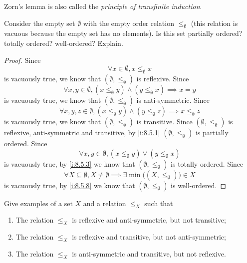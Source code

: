 \begin{note}
  Zorn's lemma is also called the \emph{principle of transfinite induction}.
\end{note}

\exercisesection

\begin{ex}\label{i:ex:8.5.1}
  Consider the empty set \(\emptyset\) with the empty order relation \(\leq_\emptyset\)
  (this relation is vacuous because the empty set has no elements).
  Is this set partially ordered? totally ordered? well-ordered? Explain.
\end{ex}

\begin{proof}
  Since
  \[
    \forall x \in \emptyset, x \leq_{\emptyset} x
  \]
  is vacuously true, we know that \((\emptyset, \leq_{\emptyset})\) is reflexive.
  Since
  \[
    \forall x, y \in \emptyset, (x \leq_{\emptyset} y) \land (y \leq_{\emptyset} x) \implies x = y
  \]
  is vacuously true, we know that \((\emptyset, \leq_{\emptyset})\) is anti-symmetric.
  Since
  \[
    \forall x, y, z \in \emptyset, (x \leq_{\emptyset} y) \land (y \leq_{\emptyset} z) \implies x \leq_{\emptyset} z
  \]
  is vacuously true, we know that \((\emptyset, \leq_{\emptyset})\) is transitive.
  Since \((\emptyset, \leq_{\emptyset})\) is reflexive, anti-symmetric and transitive, by \cref{i:8.5.1} \((\emptyset, \leq_{\emptyset})\) is partially ordered.
  Since
  \[
    \forall x, y \in \emptyset, (x \leq_{\emptyset} y) \lor (y \leq_{\emptyset} x)
  \]
  is vacuously true, by \cref{i:8.5.3} we know that \((\emptyset, \leq_{\emptyset})\) is totally ordered.
  Since
  \[
    \forall X \subseteq \emptyset, X \neq \emptyset \implies \exists \min\big((X, \leq_{\emptyset})\big) \in X
  \]
  is vacuously true, by \cref{i:8.5.8} we know that \((\emptyset, \leq_{\emptyset})\) is well-ordered.
\end{proof}

\begin{ex}\label{i:ex:8.5.2}
  Give examples of a set \(X\) and a relation \(\leq_X\) such that
  \begin{enumerate}
    \item The relation \(\leq_X\) is reflexive and anti-symmetric, but not transitive;
    \item The relation \(\leq_X\) is reflexive and transitive, but not anti-symmetric;
    \item The relation \(\leq_X\) is anti-symmetric and transitive, but not reflexive.
  \end{enumerate}
\end{ex}

